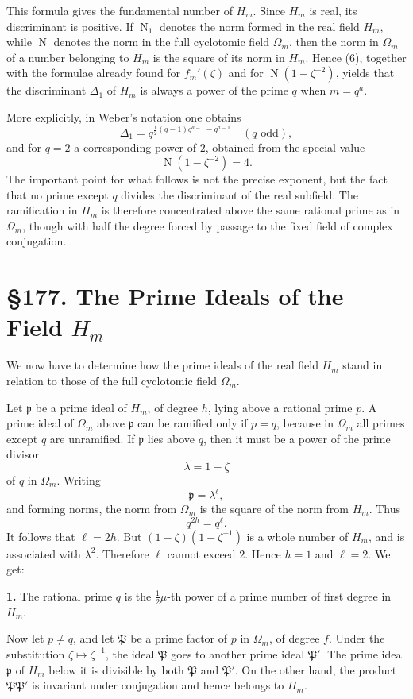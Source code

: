\documentclass[11pt,a4paper]{book}
\newcommand{\webersection}[2]{\clearpage\section*{\S #1. #2}}
\newcommand{\zetaS}{\zeta}
\providecommand{\Om}{\Omega_m}
\providecommand{\Hm}{H_m}
\providecommand{\idealp}{\mathfrak p}
\providecommand{\N}{\operatorname{N}}
\begin{document}
This formula gives the fundamental number of \(\Hm\).  Since \(\Hm\) is real, its discriminant is positive.  If \(\N_1\) denotes the norm formed in the real field \(\Hm\), while \(\N\) denotes the norm in the full cyclotomic field \(\Om\), then the norm in \(\Om\) of a number belonging to \(\Hm\) is the square of its norm in \(\Hm\).  Hence (6), together with the formulae already found for \(f_m'(\zetaS)\) and for \(\N(1-\zetaS^{-2})\), yields that the discriminant \(\Delta_1\) of \(\Hm\) is always a power of the prime \(q\) when \(m=q^a\).

More explicitly, in Weber's notation one obtains
\[
  \Delta_1=q^{\frac12(q-1)q^{a-1}-q^{a-1}}
  \quad(q\text{ odd}),
\tag{7a}
\]
and for \(q=2\) a corresponding power of \(2\), obtained from the special value
\[
  \N(1-\zetaS^{-2})=4.
\tag{7b}
\]
The important point for what follows is not the precise exponent, but the fact that no prime except \(q\) divides the discriminant of the real subfield.  The ramification in \(\Hm\) is therefore concentrated above the same rational prime as in \(\Om\), though with half the degree forced by passage to the fixed field of complex conjugation.

\webersection{177}{The Prime Ideals of the Field \(\Hm\)}

We now have to determine how the prime ideals of the real field \(\Hm\) stand in relation to those of the full cyclotomic field \(\Om\).

Let \(\idealp\) be a prime ideal of \(\Hm\), of degree \(h\), lying above a rational prime \(p\).  A prime ideal of \(\Om\) above \(\idealp\) can be ramified only if \(p=q\), because in \(\Om\) all primes except \(q\) are unramified.  If \(\idealp\) lies above \(q\), then it must be a power of the prime divisor
\[
  \lambda=1-\zetaS
\]
of \(q\) in \(\Om\).  Writing
\[
  \idealp=\lambda^\ell,
\]
and forming norms, the norm from \(\Om\) is the square of the norm from \(\Hm\).  Thus
\[
  q^{2h}=q^\ell.
\]
It follows that \(\ell=2h\).  But \((1-\zetaS)(1-\zetaS^{-1})\) is a whole number of \(\Hm\), and is associated with \(\lambda^2\).  Therefore \(\ell\) cannot exceed \(2\).  Hence \(h=1\) and \(\ell=2\).  We get:

\textbf{1.} The rational prime \(q\) is the \(\frac12\mu\)-th power of a prime number of first degree in \(\Hm\).

Now let \(p\ne q\), and let \(\mathfrak P\) be a prime factor of \(p\) in \(\Om\), of degree \(f\).  Under the substitution \(\zetaS\mapsto\zetaS^{-1}\), the ideal \(\mathfrak P\) goes to another prime ideal \(\mathfrak P'\).  The prime ideal \(\idealp\) of \(\Hm\) below it is divisible by both \(\mathfrak P\) and \(\mathfrak P'\).  On the other hand, the product \(\mathfrak P\mathfrak P'\) is invariant under conjugation and hence belongs to \(\Hm\).
\end{document}
